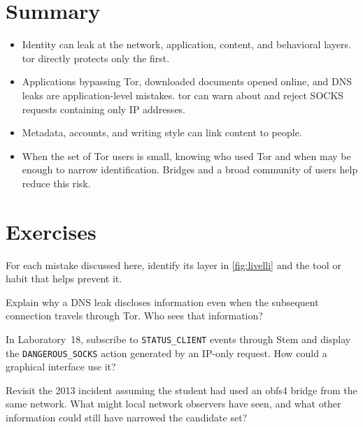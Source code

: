 \section*{Summary}
\begin{itemize}
  \item Identity can leak at the network, application, content, and behavioral layers. tor directly protects only the first.
  \item Applications bypassing Tor, downloaded documents opened online, and DNS leaks are application-level mistakes. tor can warn about and reject SOCKS requests containing only IP addresses.
  \item Metadata, accounts, and writing style can link content to people.
  \item When the set of Tor users is small, knowing who used Tor and when may be enough to narrow identification. Bridges and a broad community of users help reduce this risk.
\end{itemize}

\section*{Exercises}

\begin{esercizio}[1]\label{es:28-livello}
For each mistake discussed here, identify its layer in \cref{fig:livelli} and the tool or habit that helps prevent it.
\end{esercizio}

\begin{esercizio}[1]\label{es:28-dns}
Explain why a DNS leak discloses information even when the subsequent connection travels through Tor. Who sees that information?
\end{esercizio}

\begin{esercizio}[2]\label{es:28-evento}
In Laboratory~18, subscribe to \texttt{STATUS\_CLIENT} events through Stem and display the \texttt{DANGEROUS\_SOCKS} action generated by an IP-only request. How could a graphical interface use it?
\end{esercizio}

\begin{esercizio}[2]\label{es:28-insieme}
Revisit the 2013 incident assuming the student had used an obfs4 bridge from the same network. What might local network observers have seen, and what other information could still have narrowed the candidate set?
\end{esercizio}

